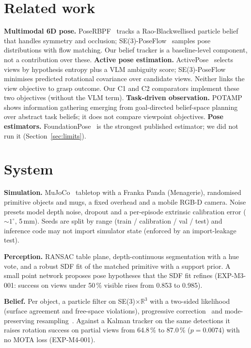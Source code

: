 \documentclass[10pt,twocolumn]{article}
\begin{document}
\section{Related work}
\textbf{Multimodal 6D pose.} PoseRBPF~\cite{deng2019poserbpf} tracks a Rao-Blackwellised
particle belief that handles symmetry and occlusion; SE(3)-PoseFlow~\cite{jin2025poseflow}
samples pose distributions with flow matching. Our belief tracker is a baseline-level component,
not a contribution over these.
\textbf{Active pose estimation.} ActivePose~\cite{liu2025activepose} selects views by hypothesis
entropy plus a VLM ambiguity score; SE(3)-PoseFlow minimises predicted rotational covariance over
candidate views. Neither links the view objective to grasp outcome. Our C1 and C2 comparators
implement these two objectives (without the VLM term).
\textbf{Task-driven observation.} POTAMP~\cite{curtis2024potamp} shows information gathering
emerging from goal-directed belief-space planning over abstract task beliefs; it does not compare
viewpoint objectives.
\textbf{Pose estimators.} FoundationPose~\cite{wen2024foundationpose} is the strongest published
estimator; we did not run it (Section~\ref{sec:limits}).

\section{System}
\textbf{Simulation.} MuJoCo~\cite{todorov2012mujoco} tabletop with a Franka Panda (Menagerie),
randomised primitive objects and mugs, a fixed overhead and a mobile RGB-D camera. Noise presets
model depth noise, dropout and a per-episode extrinsic calibration error
(${\sim}1^\circ$, 5\,mm). Seeds are split by range (train / calibration / val / test) and
inference code may not import simulator state (enforced by an import-leakage test).

\textbf{Perception.} RANSAC table plane, depth-continuous segmentation with a hue vote, and a
robust SDF fit of the matched primitive with a support prior. A small point network proposes
pose hypotheses that the SDF fit refines (EXP-M3-001: success on views under 50\,\% visible rises
from 0.853 to 0.985).

\textbf{Belief.} Per object, a particle filter on SE(3)$\times\mathbb{R}^3$ with a two-sided
likelihood (surface agreement and free-space violations), progressive
correction~\cite{oudjane2000progressive} and mode-preserving
resampling~\cite{vermaak2003mixture}. Against a Kalman tracker on the same detections it raises
rotation success on partial views from 64.8\,\% to 87.0\,\% ($p=0.0074$) with no MOTA loss
(EXP-M4-001).
\end{document}
